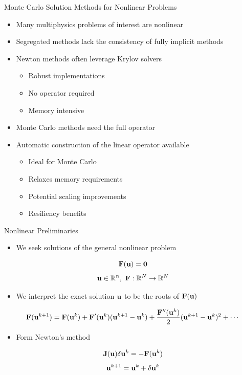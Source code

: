 \documentclass{beamer}
\begin{document}
\begin{frame}{Monte Carlo Solution Methods for Nonlinear Problems}

  \begin{itemize}
  \item Many multiphysics problems of interest are nonlinear
  \item Segregated methods lack the consistency of fully implicit
    methods
  \item Newton methods often leverage Krylov solvers
    \begin{itemize}
    \item Robust implementations
    \item No operator required
    \item Memory intensive
    \end{itemize}
  \item Monte Carlo methods need the full operator
  \item Automatic construction of the linear operator available
    \begin{itemize}
    \item Ideal for Monte Carlo
    \item Relaxes memory requirements
    \item Potential scaling improvements
    \item Resiliency benefits
    \end{itemize}
  \end{itemize}

\end{frame}

\begin{frame}{Nonlinear Preliminaries}

  \begin{itemize}
  \item We seek solutions of the general nonlinear problem
  \end{itemize}

  \[
  \mathbf{F}(\mathbf{u}) = \mathbf{0}
  \]
  \[
  \mathbf{u} \in \mathbb{R}^n,\ \mathbf{F}:\mathbb{R}^N \rightarrow
  \mathbb{R}^N
  \]

  \begin{itemize}
  \item We interpret the exact solution $\mathbf{u}$ to be the roots of
    $\mathbf{F}(\mathbf{u})$
  \end{itemize}

  \[
  \mathbf{F}(\mathbf{u}^{k+1}) = \mathbf{F}(\mathbf{u}^{k}) +
  \mathbf{F}'(\mathbf{u}^{k})(\mathbf{u}^{k+1}-\mathbf{u}^{k}) +
  \frac{\mathbf{F}''(\mathbf{u}^{k})}{2}(\mathbf{u}^{k+1}-\mathbf{u}^{k})^2 + \cdots
  \]

  \begin{itemize}
  \item Form Newton's method
  \end{itemize}
  \[
  \mathbf{J}(\mathbf{u}) \delta \mathbf{u}^k = -\mathbf{F}(\mathbf{u}^{k})
  \]
  \[
  \mathbf{u}^{k+1} = \mathbf{u}^k + \delta \mathbf{u}^k
  \]

\end{frame}
\end{document}
